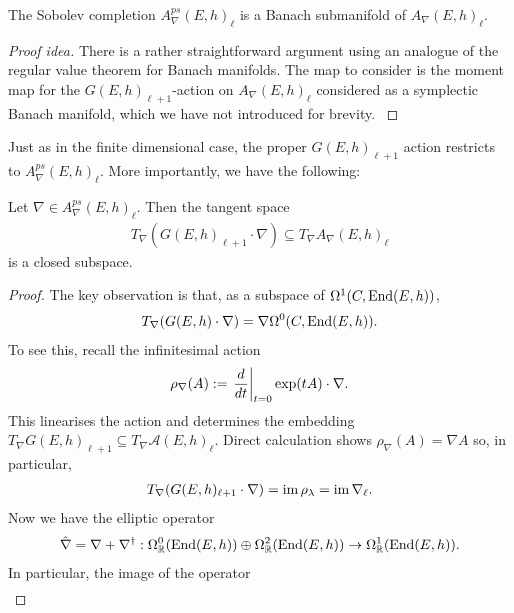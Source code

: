 \documentclass[12pt]{ociamthesis}  %
\begin{document}
\begin{lemma}
  The Sobolev completion $A^{ps}_\nabla(E,h)_\ell$ is a
  Banach submanifold of $A_\nabla(E,h)_\ell$.
  \begin{proof}[Proof idea]
    There is a rather straightforward argument using an analogue
    of the regular value theorem for Banach manifolds. The map
    to consider is the moment map for the $G(E,h)_{\ell+1}$-action
    on $A_\nabla(E,h)_\ell$ considered as a symplectic
    Banach manifold, which we have not introduced for brevity.
    \cite[Proposition 5.8]{neitzke2021}
  \end{proof}
\end{lemma}
Just as in the finite dimensional case, the proper $G(E,h)_{\ell+1}$
action restricts to $A^{ps}_\nabla(E,h)_\ell$.
More importantly, we have the following:
\begin{lemma}\label{lem:holomorphic_tangent_is_closed}
  Let $\nabla\in A^{ps}_\nabla(E,h)_{\ell}$. Then the tangent space
  \begin{align*}
    T_\nabla(G(E,h)_{\ell+1}\cdot\nabla) \subseteq T_\nabla A_\nabla(E,h)_\ell
  \end{align*}
  is a closed subspace.
  \begin{proof}
    The key observation is that, as a subspace of
    $\Omega^1(C,\operatorname{End}(E,h))$,
    \begin{align*}
      T_\nabla (G(E,h)\cdot\nabla) = \nabla\Omega^0(C,\operatorname{End}(E,h)).
    \end{align*}
    To see this, recall the infinitesimal action
    \begin{align*}
      \rho_\nabla(A) := \left.{\frac{d}{dt}}\right\vert_{t=0} \exp(tA)\cdot\nabla.
    \end{align*}
    This linearises the action and determines the embedding
    $T_\nabla G(E,h)_{\ell+1}\subseteq T_\nabla \mathcal A(E,h)_\ell$.
    Direct calculation shows $\rho_\nabla(A) = \nabla A$
    so, in particular,
    \begin{align*}
      T_\nabla(G(E,h)_{\ell+1}\cdot\nabla) = \operatorname{im}\rho_\lambda = \operatorname{im}\nabla_\ell.
    \end{align*}
    Now we have the elliptic operator
    \begin{align*}
      \hat\nabla = \nabla + \nabla^\dagger :
      \Omega^0_{\mathbb R}(\operatorname{End}(E,h)) \oplus
      \Omega^2_{\mathbb R}(\operatorname{End}(E,h)) \to
      \Omega^1_{\mathbb R}(\operatorname{End}(E,h)).
    \end{align*}
    In particular, the image of the operator
    \begin{align*}

\end{align*}
\end{proof}
\end{lemma}
\end{document}

